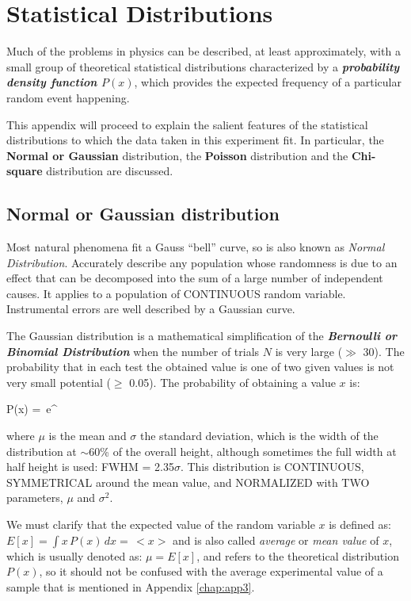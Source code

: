 \cleardoublepage
\chapter{Statistical Distributions}\label{chap:app4}

Much of the problems in physics can be described, at least approximately, with a small group of theoretical statistical distributions characterized by a \textbf{\textit{probability density function $P(x)$}}, which provides the expected frequency of a particular random event happening.

This appendix will proceed to explain the salient features of the statistical distributions to which the data taken in this experiment fit. In particular, the \textbf{Normal or Gaussian} distribution, the \textbf{Poisson} distribution and the \textbf{Chi-square} distribution are discussed.


\section{Normal or Gaussian distribution}\label{sec:gauss}

Most natural phenomena fit a Gauss \enquote{bell} curve, so is also known as \textit{Normal Distribution}. Accurately describe any population whose randomness is due to an effect that can be decomposed into the sum of a large number of independent causes. It applies to a population of CONTINUOUS random variable. Instrumental errors are well described by a Gaussian curve.

The Gaussian distribution is a mathematical simplification of the  \textbf{\textit{Bernoulli or Binomial Distribution}} when the number of trials $N$ is very large ($\gg$ 30). The probability that in each test the obtained value is one of two given values is not very small potential ($\geq$ 0.05). The probability of obtaining a value $x$ is:

	\be P(x) =  \,e^{}\ee

where $\mu$ is the mean and $\sigma$ the standard deviation, which is the width of the distribution at $\sim$60\% of the overall height, although sometimes the full width at half height is used: FWHM = 2.35$\sigma$. This distribution is CONTINUOUS, SYMMETRICAL around the mean value, and NORMALIZED with TWO parameters, $\mu$ and $\sigma^2$.

We must clarify that the expected value of the random variable $x$ is defined as: $E [x] = \int x \,P(x) \,dx = \,<x>$ and is also called \textit{average} or \textit{mean value} of $x$, which is usually denoted as: $\mu = E [x]$, and refers to the theoretical distribution $P(x)$, so it should not be confused with the average experimental value of a sample that is mentioned in Appendix \ref{chap:app3}.


